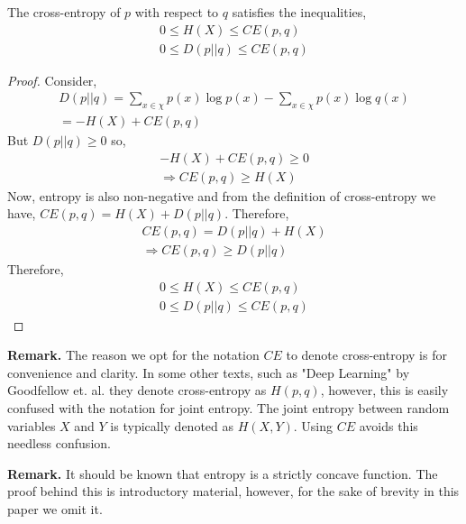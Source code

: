 \documentclass[12pt]{article}
\theoremstyle{definition}
\numberwithin{equation}{section}
\begin{document}
\theorem The cross-entropy of $p$ with respect to $q$ satisfies the inequalities,
\begin{gather*}
    0\leq H(X) \leq CE(p, q) \\
    0 \leq D(p||q) \leq CE(p, q)
\end{gather*}
\begin{proof}
Consider, 
\begin{gather*}
    D(p||q) = \sum_{x\in \chi} p(x)\log p(x) - \sum_{x\in\chi} p(x)\log q(x) \\
    = -H(X) + CE(p, q)
\end{gather*}
But $D(p||q)\geq 0$ so,
\begin{gather*}
    -H(X) + CE(p, q) \geq 0 \\
    \Rightarrow CE(p, q) \geq H(X)
\end{gather*}
Now, entropy is also non-negative and from the definition of cross-entropy we have, $CE(p,q) = H(X) + D(p||q)$. Therefore,
\begin{gather*}
    CE(p,q) = D(p||q) + H(X) \\
    \Rightarrow CE(p,q) \geq D(p||q)
\end{gather*}
Therefore, \begin{gather*}
    0\leq H(X) \leq CE(p, q) \\
    0 \leq D(p||q) \leq CE(p, q)
\end{gather*}

\end{proof}

\textbf{Remark.} The reason we opt for the notation $CE$ to denote cross-entropy is for convenience and clarity. In some other texts, such as "Deep Learning" by Goodfellow et. al. they denote cross-entropy as $H(p, q)$, however, this is easily confused with the notation for joint entropy. The joint entropy between random variables $X$ and $Y$ is typically denoted as $H(X,Y)$. Using $CE$ avoids this needless confusion.

\textbf{Remark.} It should be known that entropy is a strictly concave function. The proof behind this is introductory material, however, for the sake of brevity in this paper we omit it.
\end{document}
